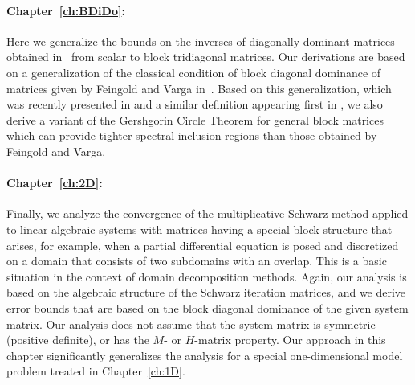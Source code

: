 \paragraph{Chapter~\ref{ch:BDiDo}:} Here we generalize the bounds
on the inverses of diagonally dominant matrices obtained in~\cite{Nabben99}
from scalar to block tridiagonal matrices. Our derivations are based on a
generalization of the classical condition of block diagonal dominance of
matrices given by Feingold and Varga in~\cite{FeiVar62}. Based on this
generalization, which was recently presented in \cite{EchLieNab18} and a
similar definition appearing first in \cite{BenEvaHamLupSla17}, we also derive
a variant of the Gershgorin Circle Theorem for general block matrices which can
provide tighter spectral inclusion regions than those obtained by Feingold and
Varga.

\paragraph{Chapter~\ref{ch:2D}:} Finally, we analyze the convergence
of the multiplicative Schwarz method applied to linear algebraic systems with
matrices having a special block structure that arises, for example, when a
partial differential equation is posed and discretized on a domain that
consists of two subdomains with an overlap. This is a basic situation in the
context of domain decomposition methods. Again, our analysis is based on the
algebraic  structure of the Schwarz iteration matrices, and we derive error
bounds that are based on the block diagonal dominance of the given system
matrix. Our analysis does not assume that the system matrix is symmetric
(positive definite), or has the $M$- or $H$-matrix property. Our approach in
this chapter significantly generalizes the analysis for a special
one-dimensional model problem treated in Chapter~\ref{ch:1D}.

